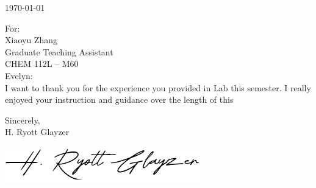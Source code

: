 \documentclass[
10pt, %
letterpaper, %
oneside, %
footinclude, %
BCOR5mm, %
]{scrartcl}
\title{\normalfont\fontsize{20}{10}\selectfont \spacedlowsmallcaps{H. Ryott Glayzer}} %
\subtitle{
    306 East Saint Joseph Street\\
    Rapid City, South Dakota 57701\\
    \href{mailto:ryott@ryott.gay}{ryott@ryott.gay} } %
\date{} %
\newcommand{\ToAddr}[1]{\noindent For:\\ #1}
\newcommand{\LetterDate}[1]{\noindent#1\par\vspace{2em}}
\newcommand{\Sign}[1]{\vspace{2em}\noindent Sincerely,\\ #1\par\vspace{0.5em}}
\begin{document}
\maketitle %

\vspace{-4em}

\LetterDate{\today}
\vspace{-0.8em}
\ToAddr{%
    Xiaoyu Zhang\\
    Graduate Teaching Assistant\\
    CHEM 112L -- M60\\}


\noindent Evelyn:\\

I want to thank you for the experience you provided in Lab this semester.
I really enjoyed your instruction and guidance over the length of this 





\Sign{H. Ryott Glayzer}
\noindent\includegraphics[scale=2.5]{signature.png}
\end{document}
